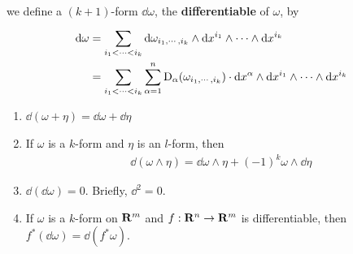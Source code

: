 we define a $(k+1)$-form $\dd\omega$, the \textbf{differentiable} of $\omega$, by 
\begin{align*}
    \mathrm{d}\omega 
    & = \sum_{i_1<\cdots<i_k}^{}{\mathrm{d}\omega_{i_1,\cdots,i_k}\wedge\mathrm{d} x^{i_1}\wedge\cdots\wedge\mathrm{d} x^{i_k}}\\
    & = \sum_{i_1<\cdots<i_k}^{}{\sum_{\alpha=1}^{n}{\mathrm{D}_\alpha(\omega_{i_1,\cdots,i_k})\cdot \mathrm{d} x^\alpha\wedge\mathrm{d} x^{i_1}\wedge\cdots\wedge\mathrm{d} x^{i_k}}}
\end{align*}

\begin{theorem}
    \begin{enumerate}[label=\upshape{(\arabic*)}]
        \item $\dd (\omega+\eta) = \dd\omega + \dd\eta$
        \item If $\omega$ is a $k$-form and $\eta$ is an $l$-form, then
            \begin{align*}
                \dd(\omega\wedge\eta) = \dd\omega\wedge\eta + (-1)^k\omega\wedge\dd\eta
            \end{align*}
        \item $\dd(\dd \omega) = 0$. Briefly, $\dd^2 = 0$.%
        \item If $\omega$ is a $k$-form on $\mathbf{R}^m$ and $f:\mathbf{R}^n\to \mathbf{R}^m$ is 
            differentiable, then $f^*(\dd\omega) = \dd(f^*\omega)$.
    \end{enumerate}
\end{theorem}

